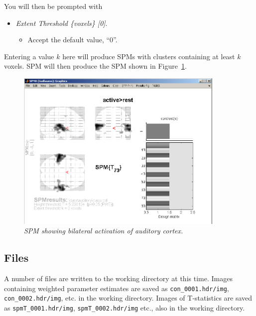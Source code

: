 
You will then be prompted with

\begin{itemize}
\item \emph{Extent Threshold \{voxels\} [0]}.
\begin{itemize}
\item Accept the default value, ``0''.
\end{itemize}
\end{itemize}

Entering a value $k$ here will produce SPMs with clusters containing at least $k$ voxels. SPM will then produce the SPM shown in Figure~\ref{aud_spm1}.

\begin{figure}
\begin{center}
\includegraphics[width=100mm]{auditory/spm1}
\caption{\em SPM showing bilateral activation of auditory cortex. \label{aud_spm1}}
\end{center}
\end{figure}

\subsection{Files}

A number of files are written to the working directory at this time.
Images containing weighted parameter estimates are saved as \texttt{con\_0001.hdr/img}, \texttt{con\_0002.hdr/img}, etc. in the working directory. Images of T-statistics are saved as \texttt{spmT\_0001.hdr/img}, \texttt{spmT\_0002.hdr/img} etc., also in the working directory.

